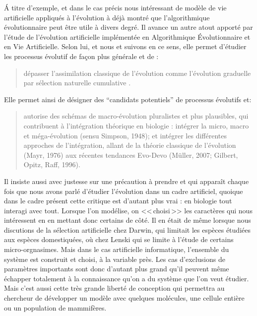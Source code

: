 \'A titre d'exemple, et dans le cas précis nous intéressant de modèle de vie artificielle appliqués à l'évolution \citet{huneman12computersciencemeetsevolutionarybiologypurepossibleprocessesissuegradualism} à déjà montré que l'algorithmique évolutionnaire peut être utile à divers degré. Il avance un autre atout apporté par l'étude de l'évolution artificielle implémentée en Algorithmique \'Evolutionnaire et en Vie Artificielle. Selon lui, et nous et suivons en ce sens, elle permet d'étudier les processus évolutif de façon plus générale et de :
\begin{quote}
	dépasser l'assimilation classique de l'évolution comme l'évolution graduelle par sélection naturelle cumulative \citep{huneman12computersciencemeetsevolutionarybiologypurepossibleprocessesissuegradualism}.
\end{quote}
Elle permet ainsi de désigner des ``candidats potentiels'' de processus évolutifs et:
\begin{quote}
	autorise des schémas de macro-évolution pluralistes et plus plausibles, qui contribuent à l'intégration théorique en biologie : intégrer la micro, macro et méga-évolution (sensu Simpson, 1948);  et intégrer les différentes approches de l'intégration, allant de la théorie classique de l'évolution (Mayr, 1976) aux récentes tendances Evo-Devo (Müller, 2007; Gilbert, Opitz, Raff, 1996).\\
	\citep{huneman12computersciencemeetsevolutionarybiologypurepossibleprocessesissuegradualism}
\end{quote}

Il insiste aussi avec justesse sur une précaution à prendre et qui apparaît chaque fois que nous avons parlé d'étudier l'évolution dans un cadre artificiel, quoique dans le cadre présent cette critique est d'autant plus vrai : en biologie tout interagi avec tout. Lorsque l'on modélise, on <<\,choisi\,>> les caractères qui nous intéressent en en mettant donc certains de côté. Il en était de même lorsque nous discutions de la sélection artificielle chez Darwin, qui limitait les espèces étudiées aux espèces domestiquées, où chez Lenski qui se limite à l'étude de certains micro-orgnasimes. Mais dans le cas artificielle informatique, l'ensemble du système est construit et choisi, à la variable près. Les cas d'exclusions de paramètres importants sont donc d'autant plus grand qu'il peuvent même échapper totalement à la connaissance qu'on a du système que l'on veut étudier. Mais c'est aussi cette très grande liberté de conception qui permettra au chercheur de développer un modèle avec quelques molécules, une cellule entière ou un population de mammifères.

